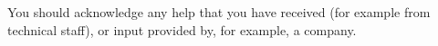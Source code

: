 \documentclass[a4paper,oneside,12pt]{book}
\numberwithin{equation}{chapter} %
\begin{document}
You should acknowledge any help that you have received (for example from technical staff), or input provided by, for example, a company.
\tableofcontents
\listoffigures
\listoftables
\newpage

\mainmatter








%


\appendix
\renewcommand{\thechapter}{A\arabic{chapter}}

\end{document}
